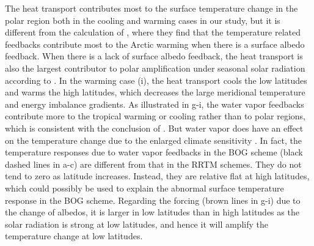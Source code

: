 The heat transport contributes most to the surface temperature change in the polar region both in the cooling and warming cases in our study, but it is different from the calculation of \cite{Pithan2014}, where they find that the temperature related feedbacks contribute most to the Arctic warming when there is a surface albedo feedback. When there is a lack of surface albedo feedback, the heat transport is also the largest contributor to polar amplification under seasonal solar radiation according to \cite{Kim2018}. In the warming case (i), the heat transport cools the low latitudes and warms the high latitudes, which decreases the large meridional temperature and energy imbalance gradients. As illustrated in g-i, the water vapor feedbacks contribute more to the tropical warming or cooling rather than to polar regions, which is consistent with the conclusion of \cite{Pithan2014}. But water vapor does have an effect on the temperature change due to the enlarged climate sensitivity \citep{Langen2012}. In fact, the temperature responses due to water vapor feedbacks in the BOG scheme (black dashed lines in a-c) are different from that in the RRTM schemes. They do not tend to zero as latitude increases. Instead, they are relative flat at high latitudes, which could possibly be used to explain the abnormal surface temperature response in the BOG scheme. Regarding the forcing (brown lines in g-i) due to the change of albedos, it is larger in low latitudes than in high latitudes as the solar radiation is strong at low latitudes, and hence it will amplify the temperature change at low latitudes.

